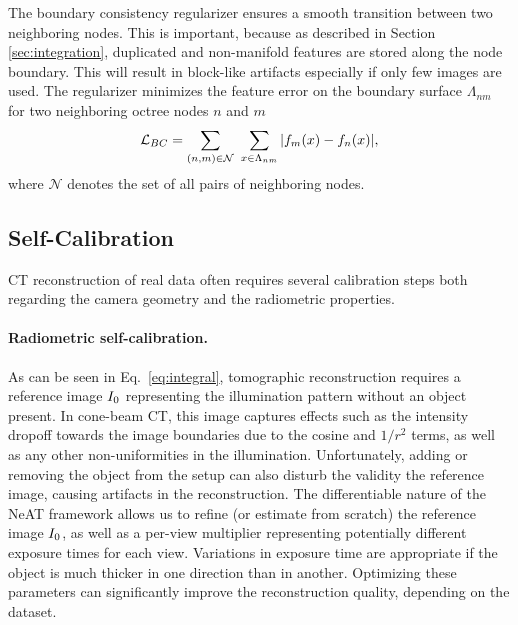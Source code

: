 \documentclass[acmtog,nonacm]{acmart} \acmSubmissionID{0438}
\newcommand{\loss}{\mathcal{L}}
\begin{document}
The boundary consistency regularizer ensures a smooth transition between two neighboring nodes.
This is important, because as described in Section \ref{sec:integration}, duplicated and non-manifold features are stored along the node boundary.
This will result in block-like artifacts especially if only few images are used.
The regularizer minimizes the feature error on the boundary surface $\Lambda_{nm}$ for two neighboring octree nodes $n$ and $m$
\begin{equation}
\loss_{BC} = \sum_{(n,m)\in \mathcal{N}} \ \sum_{x \in \Lambda_{nm}} | \feat_m(x) - \feat_n(x)|,
\label{eq:bc}
\end{equation}
where $\mathcal{N}$ denotes the set of all pairs of neighboring nodes.


\subsection{Self-Calibration}
\label{sec:self_calibration}

CT reconstruction of real data often requires several calibration
steps both regarding the camera geometry and the radiometric
properties. 

\paragraph*{Radiometric self-calibration.}
As can be seen in Eq.~\eqref{eq:integral}, tomographic reconstruction
requires a reference image $I_0$ representing the illumination
pattern without an object present. In cone-beam CT, this image
captures effects such as the intensity dropoff towards the image
boundaries due to the cosine and $1/r^2$ terms, as well as any other
non-uniformities in the illumination. Unfortunately, adding or
removing the object from the setup can also disturb the validity the
reference image, causing artifacts in the reconstruction. The
differentiable nature of the NeAT framework allows us to refine (or
estimate from scratch) the reference image $I_0$, as well as a
per-view multiplier representing potentially different exposure times
for each view. Variations in exposure time are appropriate if the
object is much thicker in one direction than in another. Optimizing
these parameters can significantly improve the reconstruction quality,
depending on the dataset.
\end{document}
